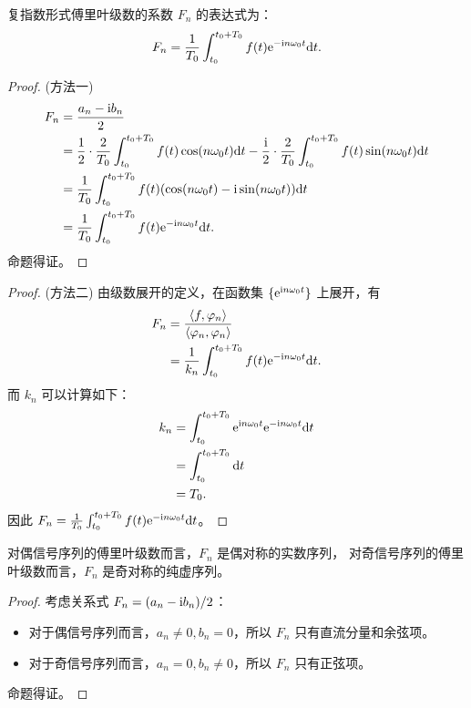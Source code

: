 \begin{property}
    复指数形式傅里叶级数的系数 $F_n$ 的表达式为：
    \begin{align*}
        F_n = \frac{1}{T_0}\int_{t_0}^{t_0 + T_0}f(t)\mathrm{e}^{-\mathrm{i} n\omega_0 t}\mathrm{d}{t}.
    \end{align*}
\end{property}

\begin{proof}
    (方法一)
    \begin{align*}
        F_n & = \frac{a_n - \mathrm{i} b_n}{2} \\
        & = \frac{1}{2} \cdot \frac{2}{T_0}\int_{t_0}^{t_0 + T_0}f(t)\cos(n\omega_0 t)\mathrm{d}{t} - \frac{\mathrm{i}}{2} \cdot \frac{2}{T_0}\int_{t_0}^{t_0 + T_0}f(t)\sin(n\omega_0 t)\mathrm{d}{t} \\
        & = \frac{1}{T_0}\int_{t_0}^{t_0 + T_0}f(t)(\cos(n\omega_0 t) - \mathrm{i} \sin(n\omega_0 t))\mathrm{d}{t} \\
        & = \frac{1}{T_0}\int_{t_0}^{t_0 + T_0}f(t)\mathrm{e}^{-\mathrm{i} n\omega_0 t}\mathrm{d}{t}.
    \end{align*}
    命题得证。
\end{proof}

\begin{proof}
    (方法二)
    由级数展开的定义，在函数集 $\{\mathrm{e}^{\mathrm{i} n\omega_0 t}\}$ 上展开，有
    \begin{align*}
        F_n & = \frac{\left\langle f, \varphi_n\right\rangle}{\left\langle\varphi_n, \varphi_n\right\rangle}\\
        & = \frac{1}{k_n}\int_{t_0}^{t_0 + T_0}f(t) \mathrm{e}^{-\mathrm{i} n\omega_0 t}\mathrm{d}{t}.
    \end{align*}
    而 $k_n$ 可以计算如下：
    \begin{align*}
        k_n & = \int_{t_0}^{t_0 + T_0}\mathrm{e}^{\mathrm{i} n\omega_0 t}\mathrm{e}^{-\mathrm{i} n\omega_0 t}\mathrm{d}{t} \\
        & = \int_{t_0}^{t_0 + T_0}\mathrm{d}{t} \\
        & = T_0.
    \end{align*}
    因此 $F_n = \frac{1}{T_0}\int_{t_0}^{t_0 + T_0}f(t)\mathrm{e}^{-\mathrm{i} n\omega_0 t}\mathrm{d}{t}$。
\end{proof}

\begin{property}
    对偶信号序列的傅里叶级数而言，$F_n$ 是偶对称的实数序列，
    对奇信号序列的傅里叶级数而言，$F_n$ 是奇对称的纯虚序列。
\end{property}

\begin{proof}
    考虑关系式 $F_n = (a_n - \mathrm{i} b_n) / 2$：
    \begin{itemize}
        \item 对于偶信号序列而言，$a_n \neq 0, b_n = 0$，所以 $F_n$ 只有直流分量和余弦项。
        \item 对于奇信号序列而言，$a_n = 0, b_n \neq 0$，所以 $F_n$ 只有正弦项。
    \end{itemize}
    命题得证。
\end{proof}

